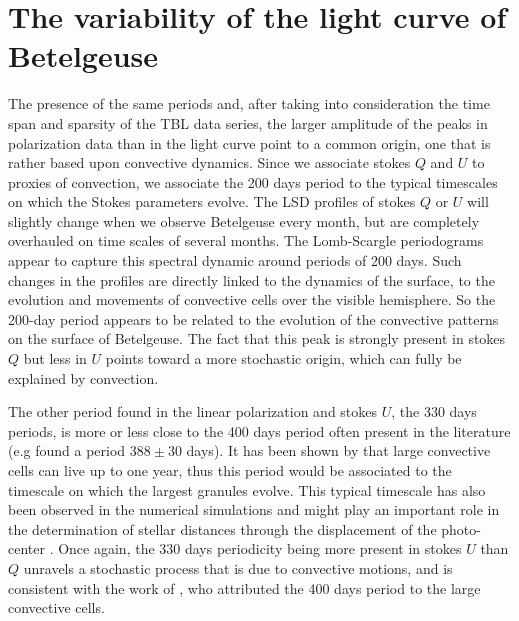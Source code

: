 \documentclass{aa}
\begin{document}
\section{The variability of the light curve of Betelgeuse}
\label{section 3}
The presence of the same 
periods and, after taking into consideration the time span and sparsity of the TBL data series, the larger amplitude of the peaks in
polarization data  than in the light curve point to a common origin, one that is rather based upon convective dynamics. Since we associate stokes $Q$ and $U$ to proxies of convection, we associate the 200 days period to the typical timescales on which the Stokes parameters evolve. 
The LSD profiles of stokes $Q$ or $U$ will slightly change when we observe Betelgeuse every month, but are completely overhauled 
on time scales of several months. The Lomb-Scargle periodograms appear to capture this spectral dynamic around periods of 200 days.
 Such changes in the profiles are directly linked to the dynamics of the surface,  to  the evolution and movements 
of convective cells over the visible hemisphere. So the 200-day period appears to be related to the evolution of the convective patterns 
on the surface of Betelgeuse.  The fact that this peak is strongly present in stokes $Q$ but less in $U$ points toward a more stochastic origin, which can fully be explained by convection.\

The other period found in the linear polarization and stokes $U$, the 330 days periods, is more or less close to the 400 days period often present in the literature (e.g \cite{kiss_variability_2006} found a period $388 \pm 30$ days). It has been shown by \cite{lopez_ariste_convective_2018} that large convective cells can live up to one year, thus this period would be associated to the timescale on which the largest granules evolve. This typical timescale has also been observed in the numerical simulations and might play an important role in the determination of stellar distances through the displacement of the photo-center \citep{chiavassa_probing_2022}. Once again, the 330 days periodicity being more present in stokes $U$ than $Q$ unravels a stochastic process that is due to convective motions, and is consistent with the work of \cite{gray_mass_2008}, who attributed the 400 days period to the large convective cells.  \
\end{document}
